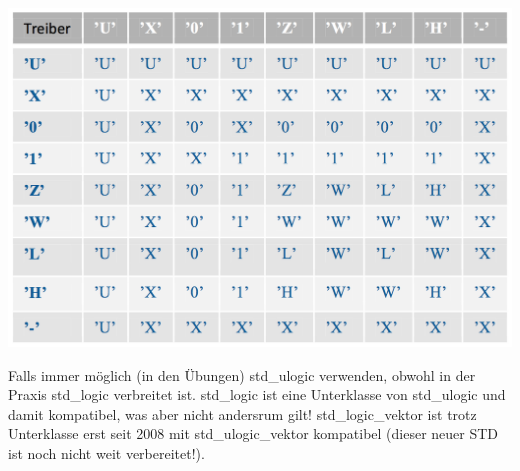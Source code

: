 \begin{minipage}{0.5\textwidth}
	\includegraphics[width=\textwidth]{./bilder/Treiber}
\end{minipage}

Falls immer möglich (in den Übungen) std\_ulogic verwenden, obwohl in der Praxis std\_logic verbreitet ist. std\_logic ist eine Unterklasse von std\_ulogic und damit kompatibel, was aber nicht andersrum gilt! std\_logic\_vektor ist trotz Unterklasse erst seit 2008 mit std\_ulogic\_vektor kompatibel (dieser neuer STD ist noch nicht weit verbereitet!).